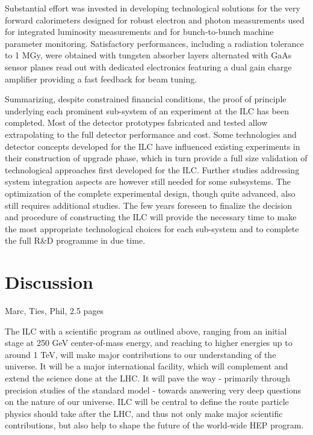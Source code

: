 \documentclass[%
 reprint,
 amsmath,amssymb,
 aps,
]{revtex4-1}
\begin{document}
Substantial eﬀort was invested in developing technological solutions for the very forward calorimeters designed for robust electron and photon measurements used for integrated luminosity measurements and for bunch-to-bunch machine parameter monitoring. Satisfactory performances, including a radiation tolerance to 1 MGy, were obtained with tungsten absorber layers alternated with GaAs sensor planes read out with dedicated electronics featuring a dual gain charge ampliﬁer providing a fast feedback for beam tuning.

Summarizing, despite constrained ﬁnancial conditions, the proof of principle underlying each prominent sub-system of an experiment at the ILC has been completed. Most of the detector prototypes fabricated and tested allow extrapolating to the full detector performance and cost. Some technologies and detector concepts developed for the ILC have influenced existing experiments in their construction of upgrade phase, which in turn provide a full size validation of technological approaches ﬁrst developed for the ILC. Further studies addressing system integration aspects are however still needed for some subsystems. The optimization of the complete experimental design, though quite advanced, also still requires additional studies. The few years foreseen to finalize the decision and procedure of constructing the ILC will provide the necessary time to make the most appropriate technological choices for each sub-system and to complete the full R\&D programme in due time.

\section{\label{sec:discussion}Discussion}

Marc, Ties, Phil, 2.5 pages

The ILC with a scientific program as outlined above, ranging from an initial stage at 250 GeV center-of-mass energy, and reaching to higher energies up to around 1 TeV, will make major contributions to our understanding of the universe. It will be a major international facility, which will complement and extend the science done at the LHC. It will pave the way - primarily through precision studies of the standard model - towards answering very deep questions on the nature of our universe. ILC will be central to define the route particle physics should take after the LHC, and thus not only make major scientific contributions, but also help to shape the future of the world-wide HEP program. 
\end{document}
